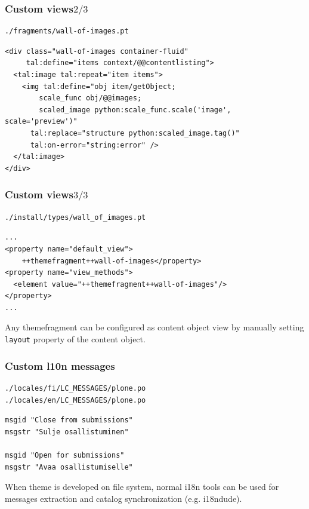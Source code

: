 \documentclass[aspectratio=43]{beamer}
\begin{document}
\begin{frame}
\frametitle{Custom views\hfill$2/3$}
\begin{verbatim}
./fragments/wall-of-images.pt
\end{verbatim}
\begin{verbatim}
<div class="wall-of-images container-fluid"
     tal:define="items context/@@contentlisting">
  <tal:image tal:repeat="item items">
    <img tal:define="obj item/getObject;
        scale_func obj/@@images;
        scaled_image python:scale_func.scale('image', scale='preview')"
      tal:replace="structure python:scaled_image.tag()"
      tal:on-error="string:error" />
  </tal:image>
</div>
\end{verbatim}
\end{frame}

\begin{frame}
\frametitle{Custom views\hfill$3/3$}
\begin{verbatim}
./install/types/wall_of_images.pt
\end{verbatim}
\begin{verbatim}
...
<property name="default_view">
    ++themefragment++wall-of-images</property>
<property name="view_methods">
  <element value="++themefragment++wall-of-images"/>
</property>
...
\end{verbatim}
\vspace{0.33cm}
Any themefragment can be configured as content object view by manually setting
\texttt{layout} property of the content object.
\end{frame}

\begin{frame}
\frametitle{Custom l10n messages}
\begin{verbatim}
./locales/fi/LC_MESSAGES/plone.po
./locales/en/LC_MESSAGES/plone.po
\end{verbatim}
\vspace{0cm}
\begin{verbatim}
msgid "Close from submissions"
msgstr "Sulje osallistuminen"

msgid "Open for submissions"
msgstr "Avaa osallistumiselle"
\end{verbatim}
\vspace{0.25cm}
When theme is developed on file system, normal i18n tools can be used
for messages extraction and catalog synchronization (e.g. i18ndude).
\end{frame}
\end{document}
